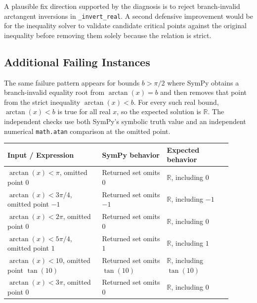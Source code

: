 \documentclass[11pt]{article}
\begin{document}
A plausible fix direction supported by the diagnosis is to reject
branch-invalid arctangent inversions in \texttt{\_invert\_real}.  A second
defensive improvement would be for the inequality solver to validate candidate
critical points against the original inequality before removing them solely
because the relation is strict.

\subsection{Additional Failing Instances}

The same failure pattern appears for bounds \(b>\pi/2\) where SymPy obtains a
branch-invalid equality root from \(\arctan(x)=b\) and then removes that point
from the strict inequality \(\arctan(x)<b\).  For every such real bound,
\(\arctan(x)<b\) is true for all real \(x\), so the expected solution is
\(\mathbb{R}\).  The independent checks use both SymPy's symbolic truth value
and an independent numerical \texttt{math.atan} comparison at the omitted
point.

\begin{center}
\small
\renewcommand{\arraystretch}{1.3}
\begin{tabular}{@{}>{\raggedright\arraybackslash}p{0.38\linewidth}>{\raggedright\arraybackslash}p{0.26\linewidth}>{\raggedright\arraybackslash}p{0.26\linewidth}@{}}
\toprule
\textbf{Input / Expression} & \textbf{SymPy behavior} & \textbf{Expected behavior} \\
\midrule
\(\arctan(x)<\pi\), omitted point \(0\) & Returned set omits \(0\) & \(\mathbb{R}\), including \(0\) \\
\(\arctan(x)<3\pi/4\), omitted point \(-1\) & Returned set omits \(-1\) & \(\mathbb{R}\), including \(-1\) \\
\(\arctan(x)<2\pi\), omitted point \(0\) & Returned set omits \(0\) & \(\mathbb{R}\), including \(0\) \\
\(\arctan(x)<5\pi/4\), omitted point \(1\) & Returned set omits \(1\) & \(\mathbb{R}\), including \(1\) \\
\(\arctan(x)<10\), omitted point \(\tan(10)\) & Returned set omits \(\tan(10)\) & \(\mathbb{R}\), including \(\tan(10)\) \\
\(\arctan(x)<3\pi\), omitted point \(0\) & Returned set omits \(0\) & \(\mathbb{R}\), including \(0\) \\
\bottomrule
\end{tabular}
\end{center}
\end{document}
